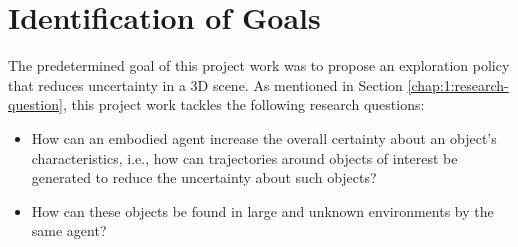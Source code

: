 \section{Identification of Goals}\label{chap:3:goal}
The predetermined goal of this project work was to propose an exploration policy that reduces uncertainty in a 3D scene. As mentioned in Section \ref{chap:1:research-question}, this project work tackles the following research questions: 
\begin{itemize}
   
    \item How can an embodied agent increase the overall certainty about an object's characteristics, i.e., how can trajectories around objects of interest be generated to reduce the uncertainty about such objects? 
    \item How can these objects be found in large and unknown environments by the same agent?
    
   
  
    
\end{itemize}

